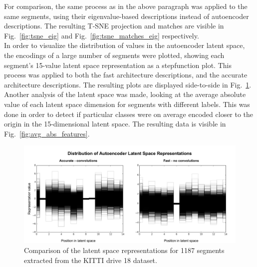 For comparison, the same process as in the above paragraph was applied to the same segments, using their eigenvalue-based descriptions instead of autoencoder descriptions. The resulting T-SNE projection and matches are visible in Fig.~\ref{fig:tsne_eig} and Fig.~\ref{fig:tsne_matches_eig} respectively.\\

In order to visualize the distribution of values in the autoencoder latent space, the encodings of a large number of segments were plotted, showing each segment's 15-value latent space representation as a stepfunction plot. This process was applied to both the fast architecture descriptions, and the accurate architecture descriptions. The resulting plots are displayed side-to-side in Fig.~\ref{fig:fastvaccurate_features}.\\

Another analysis of the latent space was made, looking at the average absolute value of each latent space dimension for segments with different labels. This was done in order to detect if particular classes were on average encoded closer to the origin in the 15-dimensional latent space. The resulting data is visible in Fig.~\ref{fig:avg_abs_features}.\\

\begin{figure}
  \centering
  \includegraphics[width=5.2in]{images/fastvaccuratefeatures.pdf}
  \caption{Comparison of the latent space representations for 1187 segments extracted from the KITTI drive 18 dataset.}
  \label{fig:fastvaccurate_features}
\end{figure}

